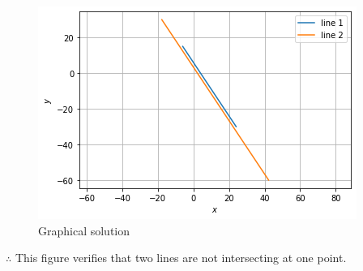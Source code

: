 \documentclass[journal,12pt,twocolumn]{IEEEtran}
\begin{document}
\begin{figure}[H]
    \includegraphics[width= \columnwidth]{download4.png}
    \caption{Graphical solution}
    \label{Fig:Graphical Solution}
\end{figure}
$\therefore$ This figure verifies that two lines are  not intersecting at one point.
\end{document}

